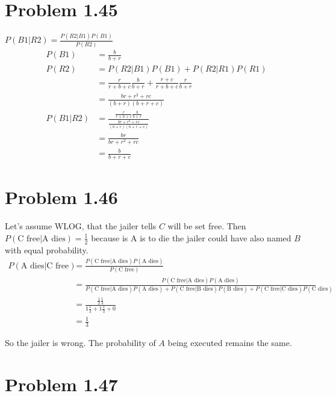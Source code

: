 \documentclass[a4paper]{article}
\begin{document}
\section*{Problem 1.45}
$P(B1|R2) = \frac{P(R2|B1)P(B1)}{P(R2)}$
\begin{align*}
P(B1) &= \frac{b}{b+r}\\
P(R2) &= P(R2|B1)P(B1) + P(R2|R1)P(R1)\\
&= \frac{r}{r+b+c}\frac{b}{b+r}+ \frac{r+c}{r+b+c}\frac{r}{b+r}\\
&= \frac{br+r^2+rc}{(b+r)(b+r+c)}\\
P(B1|R2) &= \frac{\frac{r}{r+b+c}\frac{b}{b+r}}{\frac{br+r^2+rc}{(b+r)(b+r+c)}}\\
&= \frac{br}{br+r^2+rc}\\
&= \frac{b}{b+r+c}
\end{align*}

\section*{Problem 1.46}
Let's assume WLOG, that the jailer tells $C$ will be set free.
Then $P(\text{C free} | \text{A dies}) = \frac{1}{2}$ because is A is to die the jailer could have also named $B$ with equal probability.
\begin{align*}
P(\text{A dies} | \text{C free}) &= \frac{P(\text{C free}| \text{A dies})P(\text{A dies})}{P(\text{C free})}\\
&= \frac{P(\text{C free}| \text{A dies})P(\text{A dies})}{P(\text{C free} | \text{A dies}) P(\text{A dies}) + P(\text{C free} | \text{B dies}) P(\text{B dies}) + P(\text{C free} | \text{C dies}) P(\text{C dies}) }\\
&= \frac{\frac{1}{2} \frac{1}{3}}{1\frac{1}{3} + 1\frac{1}{3} + 0}\\
&= \frac{1}{3}
\end{align*}

So the jailer is wrong. The probability of $A$ being executed remains the same.

\section*{Problem 1.47}
\end{document}
